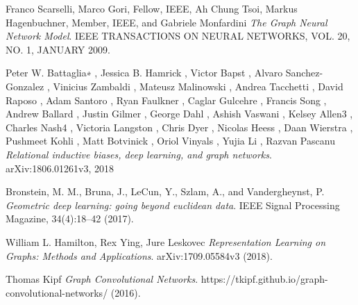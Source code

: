 \documentclass[a4paper]{article}
\begin{document}
\begin{thebibliography}{9}

Franco Scarselli, Marco Gori, Fellow, IEEE, Ah Chung Tsoi, Markus Hagenbuchner, Member, IEEE, and Gabriele Monfardini
\textit{The Graph Neural Network Model}. 
IEEE TRANSACTIONS ON NEURAL NETWORKS, VOL. 20, NO. 1, JANUARY 2009.
 
 
Peter W. Battaglia∗
, Jessica B. Hamrick
, Victor Bapst
,
Alvaro Sanchez-Gonzalez
, Vinicius Zambaldi
, Mateusz Malinowski
,
Andrea Tacchetti
, David Raposo
, Adam Santoro
, Ryan Faulkner
,
Caglar Gulcehre
, Francis Song
, Andrew Ballard
, Justin Gilmer
,
George Dahl
, Ashish Vaswani
, Kelsey Allen3
, Charles Nash4
,
Victoria Langston
, Chris Dyer
, Nicolas Heess
,
Daan Wierstra
, Pushmeet Kohli
, Matt Botvinick
,
Oriol Vinyals
, Yujia Li
, Razvan Pascanu
\textit{Relational inductive biases, deep learning, and graph networks}. 
arXiv:1806.01261v3, 2018

Bronstein, M. M., Bruna, J., LeCun, Y., Szlam, A., and Vandergheynst, P.
\textit{ Geometric deep learning: going beyond euclidean data}. 
IEEE Signal Processing Magazine, 34(4):18–42 (2017).

William L. Hamilton, Rex Ying, Jure Leskovec
\textit{ Representation Learning on Graphs: Methods and Applications}. 
arXiv:1709.05584v3  (2018).

Thomas Kipf
\textit{ Graph Convolutional Networks}. 
https://tkipf.github.io/graph-convolutional-networks/  (2016).


 
\end{thebibliography}



% 
\end{document}
